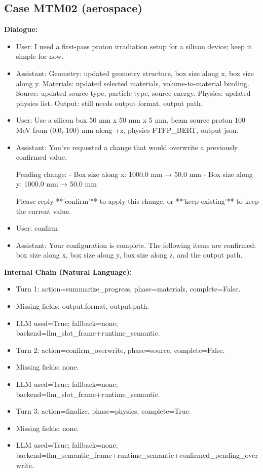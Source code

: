 \documentclass[11pt]{ctexart}
\begin{document}
\subsection{Case MTM02 (aerospace)}
\textbf{Dialogue:}
\begin{itemize}
\item User: I need a first-pass proton irradiation setup for a silicon device; keep it simple for now.
\item Assistant: Geometry: updated geometry structure, box size along x, box size along y. Materials: updated selected materials, volume-to-material binding. Source: updated source type, particle type, source energy. Physics: updated physics list. Output: still needs output format, output path.
\item User: Use a silicon box 50 mm x 50 mm x 5 mm, beam source proton 100 MeV from (0,0,-100) mm along +z, physics FTFP\_BERT, output json.
\item Assistant: You've requested a change that would overwrite a previously confirmed value.

Pending change:
- Box size along x: 1000.0 mm → 50.0 mm
- Box size along y: 1000.0 mm → 50.0 mm

Please reply **'confirm'** to apply this change, or **'keep existing'** to keep the current value.
\item User: confirm
\item Assistant: Your configuration is complete. The following items are confirmed: box size along x, box size along y, box size along z, and the output path.
\end{itemize}
\textbf{Internal Chain (Natural Language):}
\begin{itemize}
\item Turn 1: action=summarize\_progress, phase=materials, complete=False.
\item Missing fields: output.format, output.path.
\item LLM used=True; fallback=none; backend=llm\_slot\_frame+runtime\_semantic.
\item Turn 2: action=confirm\_overwrite, phase=source, complete=False.
\item Missing fields: none.
\item LLM used=True; fallback=none; backend=llm\_slot\_frame+runtime\_semantic.
\item Turn 3: action=finalize, phase=physics, complete=True.
\item Missing fields: none.
\item LLM used=True; fallback=none; backend=llm\_semantic\_frame+runtime\_semantic+confirmed\_pending\_overwrite.
\end{itemize}
\end{document}
